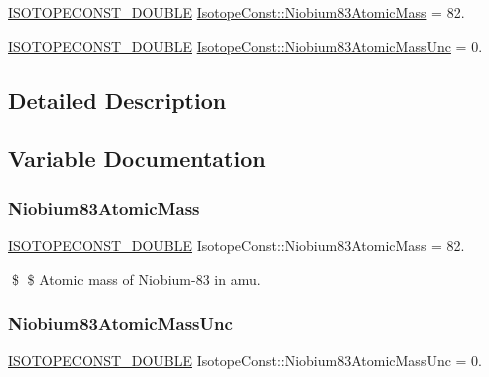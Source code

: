 \begin{DoxyCompactItemize}
\item 
\mbox{\hyperlink{group___isotope_const-_macros_ga8f45a7272ce02c0b4c65c44636ed719a}{I\+S\+O\+T\+O\+P\+E\+C\+O\+N\+S\+T\+\_\+\+D\+O\+U\+B\+LE}} \mbox{\hyperlink{group___isotope_const-_niobium-_nb83_ga3341c12a96131937bd5901af0cf0ed61}{Isotope\+Const\+::\+Niobium83\+Atomic\+Mass}} = 82.
\item 
\mbox{\hyperlink{group___isotope_const-_macros_ga8f45a7272ce02c0b4c65c44636ed719a}{I\+S\+O\+T\+O\+P\+E\+C\+O\+N\+S\+T\+\_\+\+D\+O\+U\+B\+LE}} \mbox{\hyperlink{group___isotope_const-_niobium-_nb83_ga65d29b554cc9a33515fb126d373df4fe}{Isotope\+Const\+::\+Niobium83\+Atomic\+Mass\+Unc}} = 0.
\end{DoxyCompactItemize}


\subsection{Detailed Description}


\subsection{Variable Documentation}
\mbox{\label{group___isotope_const-_niobium-_nb83_ga3341c12a96131937bd5901af0cf0ed61}} 
\subsubsection{\texorpdfstring{Niobium83\+Atomic\+Mass}{Niobium83AtomicMass}}
{\footnotesize\ttfamily \mbox{\hyperlink{group___isotope_const-_macros_ga8f45a7272ce02c0b4c65c44636ed719a}{I\+S\+O\+T\+O\+P\+E\+C\+O\+N\+S\+T\+\_\+\+D\+O\+U\+B\+LE}} Isotope\+Const\+::\+Niobium83\+Atomic\+Mass = 82.}

\$ \$ Atomic mass of Niobium-\/83 in amu. \mbox{\label{group___isotope_const-_niobium-_nb83_ga65d29b554cc9a33515fb126d373df4fe}} 
\subsubsection{\texorpdfstring{Niobium83\+Atomic\+Mass\+Unc}{Niobium83AtomicMassUnc}}
{\footnotesize\ttfamily \mbox{\hyperlink{group___isotope_const-_macros_ga8f45a7272ce02c0b4c65c44636ed719a}{I\+S\+O\+T\+O\+P\+E\+C\+O\+N\+S\+T\+\_\+\+D\+O\+U\+B\+LE}} Isotope\+Const\+::\+Niobium83\+Atomic\+Mass\+Unc = 0.}

